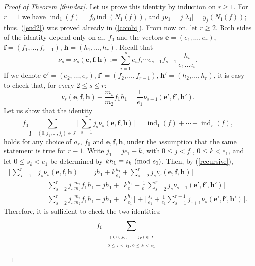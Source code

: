 \documentclass{amsart}
\def\op{\operatorname}
\def\ind{\op{ind}}
\def\j{\mathbf{j}}
\def\la{\lambda}
\def\md#1{\ \mbox{\rm(mod }{#1})}
\begin{document}
\begin{proof}[Proof of Theorem \ref{thindex}]
Let us prove this identity by induction on $r\ge 1$. For $r=1$ we have $\ind_1(f)=f_0\ind(N_1(f))$, and $j\nu_1=j|\la_1|=y_j(N_1(f))$; thus, (\ref{end2}) was proved already in (\ref{combi}). From now on, let $r\ge 2$. Both sides of the identity depend only on $a_r$, $f_0$ and the vectors
$\mathbf{e}=(e_1,\dots,e_r)$, $\mathbf{f}=(f_1,\dots,f_{r-1})$, $\mathbf{h}=(h_1,\dots,h_r)$. Recall that
$$
\nu_s=\nu_s(\mathbf{e},\mathbf{f},\mathbf{h}):=\sum_{i=1}^se_if_i\cdots e_{s-1}f_{s-1}\,\dfrac{h_i}{e_1\dots e_i}.
$$If we denote $\mathbf{e'}=(e_2,\dots,e_r)$, $\mathbf{f'}=(f_2,\dots,f_{r-1})$, $\mathbf{h'}=(h_2,\dots,h_r)$, it is easy to check that, for every $2\le s\le r$:
\begin{equation}\label{recursive}
\nu_s(\mathbf{e},\mathbf{f},\mathbf{h})-\frac{m_s}{m_2}f_1h_1=\frac 1{e_1}\nu_{s-1}(\mathbf{e'},\mathbf{f'},\mathbf{h'}).
\end{equation}
Let us show that the identity 
$$f_0\sum_{\j=(0,j_1,\dots,j_r)\in J}\Big\lfloor\sum_{s=1}^rj_s\nu_s(\mathbf{e},\mathbf{f},\mathbf{h})\Big\rfloor=\ind_1(f)+\cdots+\ind_r(f),$$
holds for any choice of $a_r$, $f_0$ and $\mathbf{e},\mathbf{f},\mathbf{h}$, under the assumption that the same statement is true for $r-1$. Write $j_1=je_1+k$, with $0\le j<f_1$, $0\le k<e_1$, and let $0\le s_k<e_1$ be determined by $kh_1\equiv s_k\md{e_1}$. Then, by (\ref{recursive}),
\begin{align*}
\Big\lfloor\sum_{s=1}^r&j_s\nu_s(\mathbf{e},\mathbf{f},\mathbf{h})\Big\rfloor=\Big\lfloor jh_1+k\frac{h_1}{e_1}+\sum_{s=2}^rj_s\nu_s(\mathbf{e},\mathbf{f},\mathbf{h})\Big\rfloor=\\
&=\sum_{s=2}^rj_s\frac{m_s}{m_2}f_1h_1+jh_1+\Big\lfloor k\frac{h_1}{e_1}+\frac1{e_1}\sum_{s=2}^rj_s\nu_{s-1}(\mathbf{e'},\mathbf{f'},\mathbf{h'})\Big\rfloor=\\
&=\sum_{s=2}^rj_s\frac{m_s}{m_2}f_1h_1+jh_1+\Big\lfloor  k\frac{h_1}{e_1}\Big\rfloor+\Big\lfloor \frac{s_k}{e_1}+\frac1{e_1}\sum_{s=1}^{r-1}j_{s+1}\nu_s(\mathbf{e'},\mathbf{f'},\mathbf{h'})\Big\rfloor.
\end{align*}
Therefore, it is sufficient to check the two identities:
$$
f_0\sum_{\begin{array}{c}
\mbox{\begin{tiny}$(0,0,j_2,\dots,j_r)\in J$\end{tiny}}\\
\mbox{\begin{tiny}$0\le j<f_1,0\le k<e_1$\end{tiny}}\end{array}
}$$
\end{proof}
\end{document}
